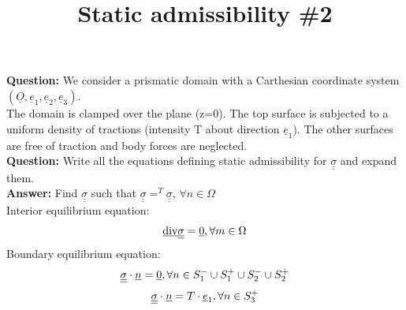 \documentclass[letter,12pt]{article}
\begin{document}
\pagestyle{fancy}

\title{\textbf{Static admissibility \#2}}
\date{}

\maketitle

\vspace{-1cm}


	\noindent \textbf{Question:} We consider a prismatic domain with a Carthesian coordinate system $(\underline{O}, \underline{e}_1, \underline{e}_2, \underline{e}_3)$. \\
	
	The domain is clamped over the plane (z=0). The top surface is subjected to a uniform density of tractions (intensity T about direction $\underline{e}_1$). The other surfaces are free of traction and body forces are neglected. \\
 
 \noindent \textbf{Question:} Write all the equations defining static admissibility for $\underline{\underline{\sigma}}$ and expand them. \\
 
 \noindent \textbf{Answer:} Find $\underline{\underline{\sigma}}$ such that $\underline{\underline{\sigma}} =^T\underline{\underline{\sigma}} $,  $\forall n \in \Omega$ \\
 Interior equilibrium equation: 
 \begin{equation}
 \underline{\text{div}} \underline{\underline{\sigma}} = \underline{0}, \forall m \in \Omega
 \end{equation}
 Boundary equilibrium equation: 
 \begin{equation}
 \underline{\underline{\sigma}} \cdot \underline{n} = \underline{0}, \forall n \in S_{1}^{-} \cup S_{1}^{+} \cup S_{2}^{-} \cup S_{2}^{+}
 \end{equation}
 \begin{equation}
 \underline{\underline{\sigma}} \cdot \underline{n} = T \cdot \underline{e}_{1}, \forall n \in S_{3}^{+}
 \end{equation}
\end{document}
